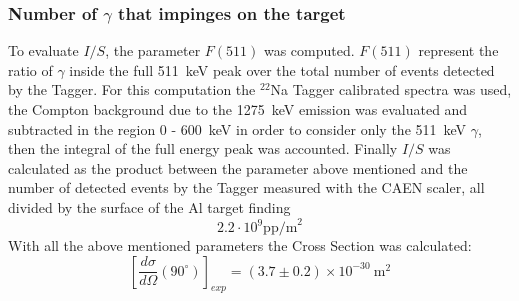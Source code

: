 \subsubsection*{Number of $\gamma$ that impinges on the target}
To evaluate $I/S$, the parameter $F(511)$ was computed. $F(511)$ represent the ratio of $\gamma$ inside the full 511~keV peak over the total number of events detected by the Tagger. For this computation the $^{22}$Na Tagger calibrated spectra was used, the Compton background due to the 1275~keV emission was evaluated and subtracted in the region 0 - 600~keV in order to consider only the 511~keV $\gamma$, then the integral of the full energy peak was accounted.
Finally $I/S$ was calculated as the product between the parameter above mentioned and the number of detected events by the Tagger measured with the CAEN scaler, all divided by the surface of the Al target finding 
\[2.2\cdot10^{9} \text{pp/m}^2\]
With all the above mentioned parameters the Cross Section was calculated:
  \begin{equation*}
  	\left[\frac{d\sigma}{d\Omega}(90^{\circ})\right]_{exp}=(3.7\pm0.2) \times 10^{-30}\ \text{m}^{2}
  \end{equation*}
  
  
 
